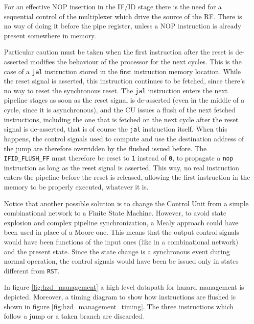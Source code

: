 \documentclass[a4paper]{article}
\begin{document}
For an effective NOP insertion in the IF/ID stage there is the need for a sequential control of the multiplexer which drive the source of the RF. There is no way of doing it before the pipe register, unless a NOP instruction is already present somewhere in memory.

Particular caution must be taken when the first instruction after the reset is de-asserted modifies the behaviour of the processor for the next cycles. This is the case of a \texttt{jal} instruction stored in the first instruction memory location. While the reset signal is asserted, this instruction continues to be fetched, since there's no way to reset the synchronous reset. The \texttt{jal} instruction enters the next pipeline stages as soon as the reset signal is de-asserted (even in the middle of a cycle, since it is asynchronous), and the CU issues a flush of the next fetched instructions, including the one that is fetched on the next cycle after the reset signal is de-asserted, that is of course the \texttt{jal} instruction itself. When this happens, the control signals used to compute and use the destination address of the jump are therefore overridden by the flushed issued before. The \texttt{IFID\_FLUSH\_FF} must therefore be reset to \texttt{1} instead of \texttt{0}, to propagate a \texttt{nop} instruction as long as the reset signal is asserted. This way, no real instruction enters the pipeline before the reset is released, allowing the first instruction in the memory to be properly executed, whatever it is.

Notice that another possible solution is to change the Control Unit from a simple combinational network to a Finite State Machine. However, to avoid state explosion and complex pipeline synchronization, a Mealy approach could have been used in place of a Moore one. This means that the output control signals would have been functions of the input ones (like in a combinational network) and the present state. Since the state change is a synchronous event during normal operation, the control signals would have been be issued only in states different from \texttt{RST}. 

In figure \ref{fig:hzd_management} a high level datapath for hazard management is depicted. Moreover, a timing diagram to show how instructions are flushed is shown in figure \ref{fig:hzd_management_timing}. The three instructions which follow a jump or a taken branch are discarded.
\end{document}
